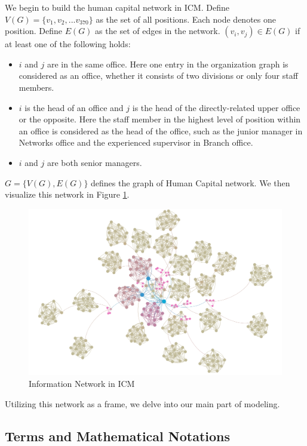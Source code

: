 \documentclass[tcn = 37075, sheet = false, abstract = false]{mcmthesis}
\begin{document}
	We begin to build the human capital network in ICM. Define $V(G)=\{v_1,v_2,...v_{370}\}$ as the set of all positions. Each node denotes one position. Define $E(G)$ as the set of edges in the network. $(v_i,v_j)\in E(G)$ if at least one of the following holds:
	
	\begin{itemize}
		\item $i$ and $j$ are in the same office. Here one entry in the organization graph is considered as an office, whether it consists of two divisions or only four staff members.
		\item $i$ is the head of an office and $j$ is the head of the directly-related upper office or the opposite. Here the staff member in the highest level of position within an office is considered as the head of the office, such as the junior manager in Networks office and the experienced supervisor in Branch office.
		\item $i$ and $j$ are both senior managers.
	\end{itemize}
	
	$G=\{V(G),E(G)\}$ defines the graph of Human Capital network. We then visualize this network in Figure \ref{fig:Information Network in ICM}.
	
	\begin{figure}[htb!]
		\small
		\centering
		\includegraphics[width=14cm]{figure_2.png}
		\caption{Information Network in ICM} \label{fig:Information Network in ICM}
	\end{figure}
	
	Utilizing this network as a frame, we delve into our main part of modeling.
	
	\subsection{Terms and Mathematical Notations}
	
\end{document}
